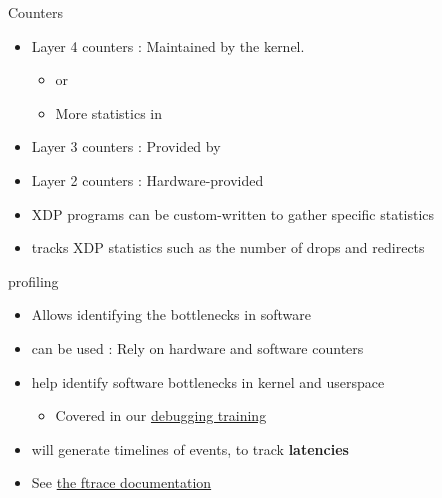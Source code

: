 \begin{frame}{Counters}
	\begin{itemize}
		\item Layer 4 counters : Maintained by the kernel.
			\begin{itemize}
				\item {} or 
				\item More statistics in 
			\end{itemize}
		\item Layer 3 counters : Provided by 
		\item Layer 2 counters : Hardware-provided
		\item XDP programs can be custom-written to gather specific statistics
		\item {} tracks XDP statistics such as the number of drops and redirects
	\end{itemize}
\end{frame}

\begin{frame}{profiling}
	\begin{itemize}
		\item Allows identifying the bottlenecks in software
		\item {} can be used : Rely on hardware and software counters
		\item {} help identify software bottlenecks in kernel and userspace
			\begin{itemize}
				\item Covered in our \href{https://bootlin.com/training/debugging/}{debugging training}
			\end{itemize}
		\item {} will generate timelines of events, to track \textbf{latencies}
		\item See \href{https://docs.kernel.org/trace/ftrace.html}{the ftrace documentation}
	\end{itemize}
\end{frame}

